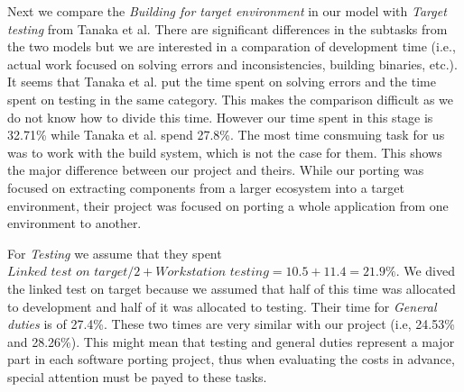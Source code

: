 Next we compare the \textit{Building for target environment} in our model with
\textit{Target testing} from Tanaka et al. There are significant differences in
the subtasks from the two models but we are interested in a comparation of
development time (i.e., actual work focused on solving errors and
inconsistencies, building binaries, etc.). It seems that Tanaka et al. put the
time spent on solving errors and the time spent on testing in the same category.
This makes the comparison difficult as we do not know how to divide this time.
However our time spent in this stage is 32.71\% while Tanaka et al. spend
27.8\%. The most time consmuing task for us was to work with the build system,
which is not the case for them. This shows the major difference between our
project and theirs.  While our porting was focused on extracting components from
a larger ecosystem into a target environment, their project was focused on
porting a whole application from one environment to another.

For \textit{Testing} we assume that they spent $\textit{Linked test on target} /
2 + \textit{Workstation testing} =  10.5 + 11.4 = 21.9\%$. We dived the linked
test on target because we assumed that half of this time was allocated to
development and half of it was allocated to testing. Their time for
\textit{General duties} is of 27.4\%. These two times are very similar with our
project (i.e, 24.53\% and 28.26\%). This might mean that testing and general
duties represent a major part in each software porting project, thus when
evaluating the costs in advance, special attention must be payed to these tasks.
